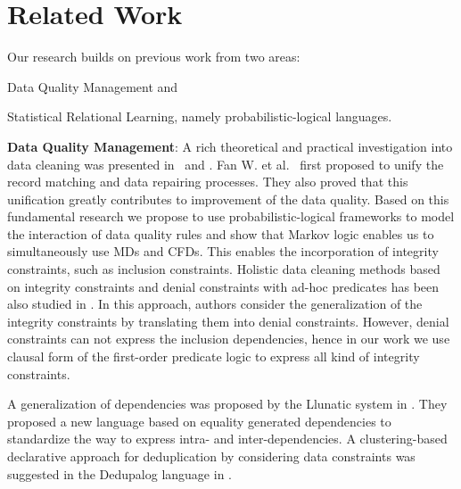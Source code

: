 
\section{Related Work}
\label{sec:related}

Our research builds on previous work from two areas: 
\begin{inparaenum}[\itshape 1\upshape)]
\item Data Quality Management and
\item Statistical Relational Learning, namely probabilistic-logical languages.
\end{inparaenum}

\textbf{Data Quality Management}: A rich theoretical and practical investigation into data cleaning was presented in~\cite{Fan:2014:IRM:2628135.2567657} and \cite{fellegi1976systematic}. Fan W. et al.~\cite{Fan:2011:IRM:1989323.1989373} first proposed to unify the record matching and data repairing processes. They also proved that this unification greatly contributes to improvement of the data quality. Based on this fundamental research we propose to use probabilistic-logical frameworks to model the interaction of data quality rules and show that Markov logic enables us to simultaneously use MDs and CFDs. This enables the incorporation of integrity constraints, such as inclusion constraints. Holistic data cleaning methods based on integrity constraints and denial constraints with ad-hoc predicates has been also studied in \cite{chu2013holistic}. In this approach, authors consider the generalization of the integrity constraints by translating them into denial constraints. However, denial constraints can not express the inclusion dependencies, hence in our work we use clausal form of the first-order predicate logic to express all kind of integrity constraints.

A generalization of dependencies was proposed by the Llunatic system in \cite{llunaticVDLB2013b}. They proposed a new language based on equality generated dependencies to standardize the way to express intra- and inter-dependencies. A clustering-based declarative approach for deduplication by considering data constraints was suggested in the Dedupalog language in \cite{Arasu:2009:LDC:1546683.1547340}.

